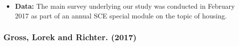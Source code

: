 \documentclass[a4paper, 12pt]{article}
\begin{document}
\begin{itemize}
\begin{itemize}
\begin{itemize}
            \item 3. Elicit WTP for for their most preferred piece of information, by giving experimentally varied prices. 
            \item 4. Respondents get to see their preferred piece of information if they drew a scenario in which they see information. 
        \end{itemize}
        \item 
    \end{itemize}
    \item \textbf{Data:} The main survey underlying our study was conducted in February 2017 as part of an annual SCE special module on the topic of housing.
\end{itemize}

\subsubsection*{Gross, Lorek and Richter. (2017)}
\end{document}
